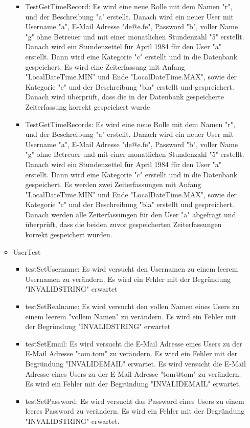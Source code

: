 \begin{itemize}
\begin{itemize}
\begin{itemize}
            \item TestGetTimeRecord: Es wird eine neue Rolle mit dem Namen "r", und der Beschreibung "a" erstellt. Danach wird ein neuer User mit Username "a", E-Mail Adresse "de@e.fe", Password "b", voller Name "g" ohne Betreuer und mit einer monatlichen Stundenzahl "5" erstellt. Danach wird ein Stundenzettel für April 1984 für den User "a" erstellt. Dann wird eine Kategorie "c" erstellt und in die Datenbank gespeichert. Es wird eine Zeiterfassung mit Anfang "LocalDateTime.MIN" und Ende "LocalDateTime.MAX", sowie der Kategorie "c" und der Beschreibung "bla" erstellt und gespreichert. Danach wird überprüft, dass die in der Datenbank gespeicherte Zeiterfassung korrekt gespeichert wurde
            \item TestGetTimeRecords: Es wird eine neue Rolle mit dem Namen "r", und der Beschreibung "a" erstellt. Danach wird ein neuer User mit Username "a", E-Mail Adresse "de@e.fe", Password "b", voller Name "g" ohne Betreuer und mit einer monatlichen Stundenzahl "5" erstellt. Danach wird ein Stundenzettel für April 1984 für den User "a" erstellt. Dann wird eine Kategorie "c" erstellt und in die Datenbank gespeichert. Es werden zwei Zeiterfassungen mit Anfang "LocalDateTime.MIN" und Ende "LocalDateTime.MAX", sowie der Kategorie "c" und der Beschreibung "bla" erstellt und gespreichert. Danach werden alle Zeiterfassungen für den User "a" abgefragt und überprüft, dass die beiden zuvor gespeicherten Zeiterfassungen korrekt gespeichert wurden.
          \end{itemize}
        \item UserTest
          \begin{itemize}
            \item testSetUsername: Es wird versucht den Usernamen zu einem leerem Usernamen zu verändern. Es wird ein Fehler mit der Begründung "INVALIDSTRING" erwartet
            \item testSetRealname: Es wird versucht den vollen Namen eines Users zu einem leerem "vollem Namen" zu verändern. Es wird ein Fehler mit der Begründung "INVALIDSTRING" erwartet
            \item testSetEmail: Es wird versucht die E-Mail Adresse eines Users zu der E-Mail Adresse "tom.tom" zu verändern. Es wird ein Fehler mit der Begründung "INVALIDEMAIL" erwartet. Es wird versucht die E-Mail Adresse eines Users zu der E-Mail Adresse "tom@tom" zu verändern. Es wird ein Fehler mit der Begründung "INVALIDEMAIL" erwartet.
            \item testSetPassword: Es wird versucht das Password eines Users zu einem leeres Password zu verändern. Es wird ein Fehler mit der Begründung "INVALIDSTRING" erwartet.
        
          \end{itemize}
      \end{itemize}
\end{itemize}

